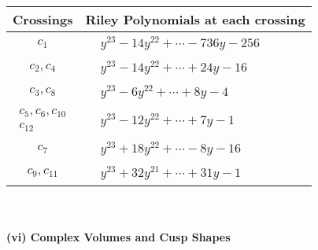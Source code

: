 \documentclass[1p]{elsarticle_modified}
\theoremstyle{definition}
\begin{document}
\begin{tabular}{m{50pt}|m{274pt}}
Crossings & \hspace{64pt}Riley Polynomials at each crossing \\
\hline $$\begin{aligned}c_{1}\end{aligned}$$&$\begin{aligned}
&y^{23}-14 y^{22}+\cdots-736 y-256
\end{aligned}$\\
\hline $$\begin{aligned}c_{2},c_{4}\end{aligned}$$&$\begin{aligned}
&y^{23}-14 y^{22}+\cdots+24 y-16
\end{aligned}$\\
\hline $$\begin{aligned}c_{3},c_{8}\end{aligned}$$&$\begin{aligned}
&y^{23}-6 y^{22}+\cdots+8 y-4
\end{aligned}$\\
\hline $$\begin{aligned}c_{5},c_{6},c_{10}\\c_{12}\end{aligned}$$&$\begin{aligned}
&y^{23}-12 y^{22}+\cdots+7 y-1
\end{aligned}$\\
\hline $$\begin{aligned}c_{7}\end{aligned}$$&$\begin{aligned}
&y^{23}+18 y^{22}+\cdots-8 y-16
\end{aligned}$\\
\hline $$\begin{aligned}c_{9},c_{11}\end{aligned}$$&$\begin{aligned}
&y^{23}+32 y^{21}+\cdots+31 y-1
\end{aligned}$\\
\hline
\end{tabular}\\~\\
\newpage\flushleft \textbf{(vi) Complex Volumes and Cusp Shapes}
\end{document}
